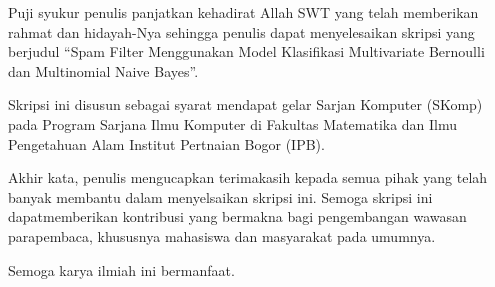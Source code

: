 Puji syukur penulis panjatkan kehadirat Allah SWT yang telah memberikan rahmat dan hidayah-Nya sehingga penulis dapat menyelesaikan skripsi yang berjudul “Spam Filter Menggunakan Model Klasifikasi Multivariate Bernoulli dan Multinomial Naive Bayes”.

Skripsi ini disusun sebagai syarat mendapat gelar Sarjan Komputer (SKomp) pada Program Sarjana Ilmu Komputer di Fakultas Matematika dan Ilmu Pengetahuan Alam Institut Pertnaian Bogor (IPB).

Akhir kata, penulis mengucapkan terimakasih kepada semua pihak yang telah banyak membantu dalam menyelsaikan skripsi ini. Semoga skripsi ini dapatmemberikan kontribusi yang bermakna bagi pengembangan wawasan parapembaca, khususnya mahasiswa dan masyarakat pada umumnya.

Semoga karya ilmiah ini bermanfaat.
